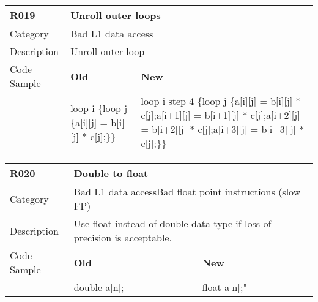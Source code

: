 \begin{tabular}{|p{0.9in}|p{2.0in}|p{2.0in}|} \hline
\textbf{R019}       & \multicolumn{2}{|p{4.0in}|}{\textbf{Unroll outer loops}} \\ \hline
Category            & \multicolumn{2}{|p{4.0in}|}{Bad L1 data access} \\ \hline
Description         & \multicolumn{2}{|p{4.0in}|}{Unroll outer loop} \\ \hline
Code Sample         & \textbf{Old} & \textbf{New} \\ \hline
                    & loop i \{\newline   loop j \{\newline     a[i][j] = b[i][j] * c[j];\newline   \}\newline \}
                    & loop i step 4 \{\newline   loop j \{\newline     a[i][j] = b[i][j] * c[j];\newline     a[i+1][j] = b[i+1][j] * c[j];\newline     a[i+2][j] = b[i+2][j] * c[j];\newline     a[i+3][j] = b[i+3][j] * c[j];\newline   \}\newline \} \\ \hline
\end{tabular}

\begin{tabular}{|p{0.9in}|p{2.0in}|p{2.0in}|} \hline
\textbf{R020}       & \multicolumn{2}{|p{4.0in}|}{\textbf{Double to float}} \\ \hline
Category            & \multicolumn{2}{|p{4.0in}|}{Bad L1 data access\newline Bad float point instructions (slow FP)} \\ \hline
Description         & \multicolumn{2}{|p{4.0in}|}{Use float instead of double data type if loss of precision is acceptable.} \\ \hline
Code Sample         & \textbf{Old} & \textbf{New} \\ \hline
                    & double a[n]; & float a[n];" \\ \hline
\end{tabular}

